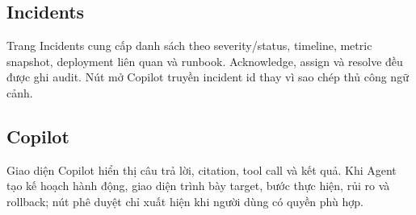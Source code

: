 \subsection{Incidents}

Trang Incidents cung cấp danh sách theo severity/status, timeline, metric snapshot,
deployment liên quan và runbook. Acknowledge, assign và resolve đều được ghi
audit. Nút mở Copilot truyền incident id thay vì sao chép thủ công ngữ cảnh.

\subsection{Copilot}

Giao diện Copilot hiển thị câu trả lời, citation, tool call và kết quả. Khi Agent
tạo kế hoạch hành động, giao diện trình bày target, bước thực hiện, rủi ro và
rollback; nút phê duyệt chỉ xuất hiện khi người dùng có quyền phù hợp.